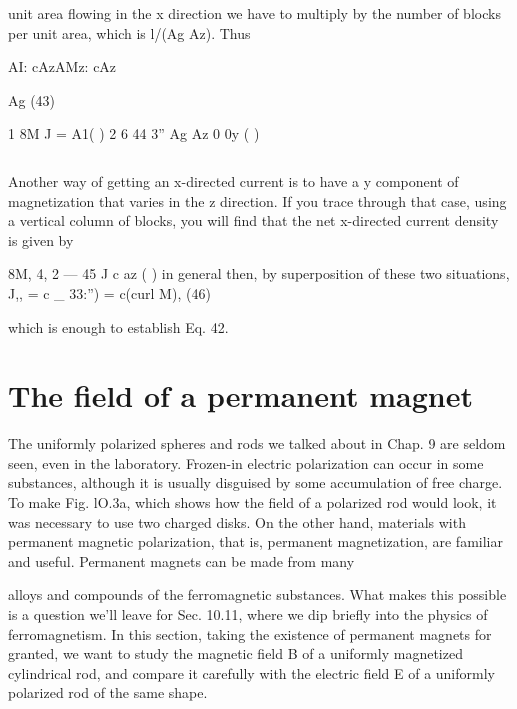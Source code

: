 {unit area flowing in the x direction we have to multiply by the number
of blocks per unit area, which is l/(Ag Az). Thus
\begin{equation}
\end{equation}

AI: cAzAMz: cAz

Ag (43)

1 8M
J = A1( ) 2 6 44
3'' Ag Az 0 0y ( )

\begin{equation}
\end{equation}

Another way of getting an x-directed current is to have a y component
of magnetization that varies in the z direction. If you trace
through that case, using a vertical column of blocks, you will find
that the net x-directed current density is given by
\begin{equation}
\end{equation}

8M,
4, 2  ---  45
J c az ( )
in general then, by superposition of these two situations,
\begin{equation}
\end{equation}
J,, = c  _ 33:'') = c(curl M), (46)

which is enough to establish Eq. 42.

\section{The field of a permanent magnet}

The uniformly polarized spheres and rods we talked about in
Chap. 9 are seldom seen, even in the laboratory. Frozen-in electric
polarization can occur in some substances, although it is usually
disguised by some accumulation of free charge. To make Fig. lO.3a,
which shows how the field of a polarized rod would look, it was necessary
to use two charged disks. On the other hand, materials with
permanent magnetic polarization, that is, permanent magnetization,
are familiar and useful. Permanent magnets can be made from many

alloys and compounds of the ferromagnetic substances. What
makes this possible is a question we'll leave for Sec. 10.11, where we
dip briefly into the physics of ferromagnetism. In this section, taking
the existence of permanent magnets for granted, we want to study
the magnetic field B of a uniformly magnetized cylindrical rod, and
compare it carefully with the electric field E of a uniformly polarized
rod of the same shape.

}
